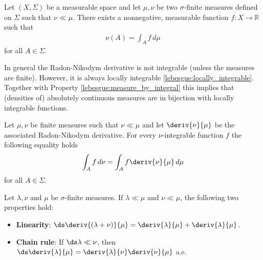     \begin{theorem}\label{lebesgue:radon_nikodym}
        Let $(X,\Sigma)$ be a measurable space and let $\mu,\nu$ be two $\sigma$-finite measures defined on $\Sigma$ such that $\nu\ll\mu$. There exists a nonnegative, measurable function $f:X\rightarrow\mathbb{R}$ such that
        \begin{gather}
            \nu(A) = \int_Af\,d\mu
        \end{gather}
        for all $A\in\Sigma$.
    \end{theorem}
    \begin{property}[Integrability]
        In general the Radon-Nikodym derivative is not integrable (unless the measures are finite). However, it is always locally integrable \ref{lebesgue:locally_integrable}. Together with Property \ref{lebesgue:measure_by_integral} this implies that (densities of) absolutely continuous measures are in bijection with locally integrable functions.
    \end{property}

    \begin{property}
        Let $\mu,\nu$ be finite measures such that $\nu\ll\mu$ and let $\deriv{\nu}{\mu}$ be the associated Radon-Nikodym derivative. For every $\nu$-integrable function $f$ the following equality holds
        \begin{gather}
            \int_A f\,d\nu = \int_Af\deriv{\nu}{\mu}\,d\mu
        \end{gather}
        for all $A\in\Sigma$.
    \end{property}

    \begin{property}
        Let $\lambda,\nu$ and $\mu$ be $\sigma$-finite measures. If $\lambda\ll\mu$ and $\nu\ll\mu$, the following two properties hold:
        \begin{itemize}
            \item\textbf{Linearity}: $\ds\deriv{(\lambda+\nu)}{\mu} = \deriv{\lambda}{\mu} + \deriv{\lambda}{\mu}$.
            \item\textbf{Chain rule}: If $\ds\lambda\ll\nu$, then $\ds\deriv{\lambda}{\mu} = \deriv{\lambda}{\nu}\deriv{\nu}{\mu}$ a.e.
        \end{itemize}
    \end{property}

